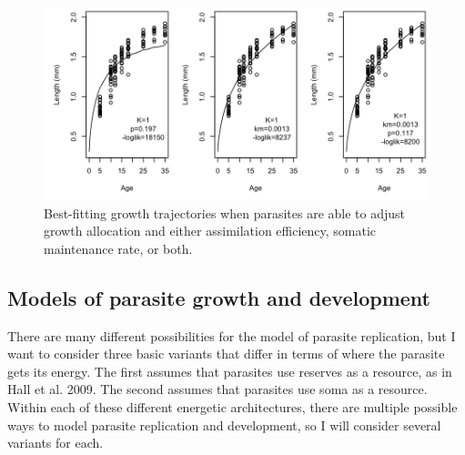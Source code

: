 \documentclass[12pt,reqno,final,pdftex]{amsart}\usepackage[]{graphicx}\usepackage[]{color}
\newenvironment{knitrout}{}{} %
\theoremstyle{plain}
\numberwithin{equation}{part}
\begin{document}
\begin{knitrout}\scriptsize
{}\color{fgcolor}\begin{figure}

\includegraphics[width=\linewidth]{figure/inf-length-2-1} \hfill{}

\caption[Best-fitting growth trajectories when parasites are able to adjust growth allocation and either assimilation efficiency, somatic maintenance rate, or both]{Best-fitting growth trajectories when parasites are able to adjust growth allocation and either assimilation efficiency, somatic maintenance rate, or both.}\label{fig:inf-length-2}
\end{figure}


\end{knitrout}

\subsection*{Models of parasite growth and development}

There are many different possibilities for the model of parasite replication, but I want to consider three basic variants that differ in terms of where the parasite gets its energy.
The first assumes that parasites use reserves as a resource, as in Hall et al. 2009.
The second assumes that parasites use soma as a resource.
Within each of these different energetic architectures, there are multiple possible ways to model parasite replication and development, so I will consider several variants for each.
\end{document}
